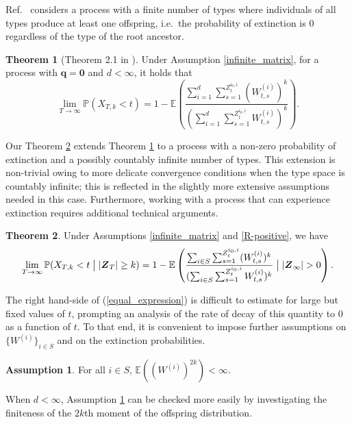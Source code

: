 \documentclass[preprint,3p,12pt]{elsarticle}
\theoremstyle{definition}
\newtheorem{assumption}{Assumption}
\newtheorem{theorem}{Theorem}
\newcommand{\z}[1][i_0, i]{Z_t^{#1}}
\begin{document}
Ref.\ \cite{Hong2015} considers a process with a finite number of types where individuals of all types produce at least one offspring, i.e.\ the probability of extinction is $0$ regardless of the type of the root ancestor. 
\begin{theorem}[Theorem 2.1 in \cite{Hong2015}]\label{thm_hong}
Under Assumption \ref{infinite_matrix}, for a process with $\boldsymbol{q} = \boldsymbol{0}$ and $d < \infty$, it holds that
    \begin{equation*}
         \lim_{T \rightarrow \infty}\mathbb{P}(X_{T,k} < t) %
    = 1 - \mathbb{E}\left(\frac{\sum_{i=1}^d\sum_{s=1}^{\z} (W^{(i)}_{t,s})^k }
    {(\sum_{i=1}^d\sum_{s=1}^{\z}W^{(i)}_{t,s})^k}  \right).
    \end{equation*}
\end{theorem}
Our Theorem \ref{exact_thm} extends Theorem \ref{thm_hong} to a process with a non-zero probability of extinction and a possibly countably infinite number of types. This extension is non-trivial owing to more delicate convergence conditions when the type space is countably infinite; this is reflected in the slightly more extensive assumptions needed in this case. Furthermore, working with a process that can experience extinction requires additional technical arguments. 
\begin{theorem} \label{exact_thm}
 Under Assumptions \ref{infinite_matrix} and \ref{R-positive}, we have
\begin{equation}
    \lim_{T \rightarrow \infty}\mathbb{P}(X_{T,k} < t\bigm| |\boldsymbol{Z}_T| \ge k ) %
    = 1 - \mathbb{E}\left(\frac{\sum_{i \in S}\sum_{s=1}^{\z} (W^{(i)}_{t,s})^k }
    {(\sum_{i \in S}\sum_{s=1}^{\z}W^{(i)}_{t, s})^k}\bigm| |\boldsymbol{Z}_{\infty}| > 0  \right) .\label{equal_expression}
\end{equation}
\end{theorem}
The right hand-side of (\ref{equal_expression}) is difficult to estimate for large but fixed values of $t$, prompting an analysis of the rate of decay of this quantity to 0 as a function of $t$. To that end, it is convenient to impose further assumptions on $\{W^{(i)}\}_{i \in S}$ and on the extinction probabilities.

\begin{assumption}\label{moments}
    For all $i \in S$, $\mathbb{E}((W^{(i)})^{2k}) < \infty$.
\end{assumption}

When $d < \infty$, Assumption \ref{moments} can be checked more easily by investigating the finiteness of the $2k$th moment of the offspring distribution.
\end{document}
